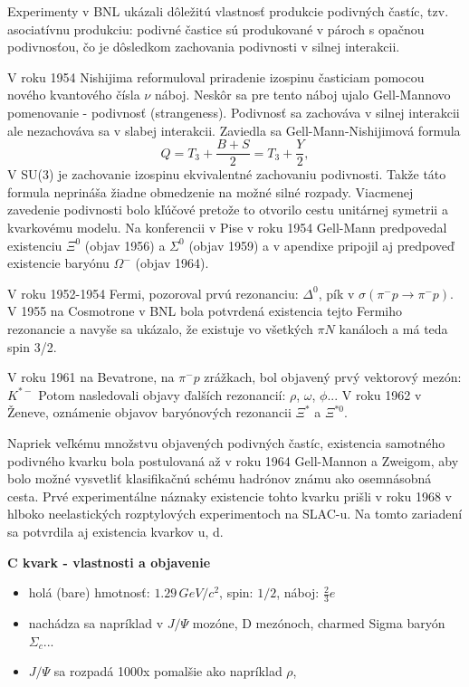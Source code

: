 \documentclass[../../main.tex]{subfiles}
\begin{document}
Experimenty v BNL ukázali dôležitú vlastnosť produkcie podivných častíc, tzv. asociatívnu produkciu: podivné častice sú produkované v pároch s opačnou podivnosťou, čo je dôsledkom zachovania podivnosti v silnej interakcii.

V roku 1954 Nishijima reformuloval priradenie izospinu časticiam pomocou nového kvantového čísla $\nu$ náboj. Neskôr sa pre tento náboj ujalo Gell-Mannovo pomenovanie - podivnosť (strangeness). Podivnosť sa zachováva v silnej interakcii ale nezachováva sa v slabej interakcii. Zaviedla sa Gell-Mann-Nishijimová formula
$$ Q = T_3 + \frac{B+S}{2} = T_3 + \frac{Y}{2},$$
V SU(3) je zachovanie izospinu ekvivalentné zachovaniu podivnosti. Takže táto formula neprináša žiadne obmedzenie na možné silné rozpady. Viacmenej zavedenie podivnosti bolo kľúčové pretože to otvorilo cestu unitárnej symetrii a kvarkovému modelu. 
Na konferencii v Pise v roku 1954 Gell-Mann predpovedal existenciu $\Xi^0$ (objav 1956) a $\Sigma^0$ (objav 1959) a v apendixe pripojil aj predpoveď existencie baryónu $\Omega^-$ (objav 1964).

V roku 1952-1954 Fermi, pozoroval prvú rezonanciu: $\Delta^0$, pík v $\sigma(\pi^{-}p \rightarrow \pi^{-}p)$. V 1955 na Cosmotrone v BNL bola potvrdená existencia tejto Fermiho rezonancie a navyše sa ukázalo, že existuje vo všetkých $\pi N$ kanáloch a má teda spin 3/2. 

V roku 1961 na Bevatrone, na $\pi^{-}p$ zrážkach, bol objavený prvý vektorový mezón: $K^{*-}$ Potom nasledovali objavy ďalších rezonancií: $\rho$, $\omega$, $\phi$... V roku 1962 v Ženeve, oznámenie objavov baryónových rezonancii $\Xi^{*}$ a $\Xi^{*0}$. 

Napriek veľkému množstvu objavených podivných častíc, existencia samotného podivného kvarku bola postulovaná až v roku 1964 Gell-Mannon a Zweigom, aby bolo možné vysvetliť klasifikačnú schému hadrónov známu ako osemnásobná cesta. Prvé experimentálne náznaky existencie tohto kvarku prišli v roku 1968 v hlboko neelastických rozptylových experimentoch na SLAC-u. Na tomto zariadení sa potvrdila aj existencia kvarkov u, d.
\newline

\textbf{C kvark - vlastnosti a objavenie}
\begin{itemize}
\item holá (bare) hmotnosť: $1.29\,\unit{GeV}/c^2$, spin: $1/2$, náboj: $\frac{2}{3}e$ 
\item nachádza sa napríklad v $J/\Psi$ mozóne, D mezónoch, charmed Sigma baryón $\Sigma_c$...
\item $J/\Psi$ sa rozpadá 1000x pomalšie ako napríklad $\rho$, 
\end{itemize}
\end{document}
